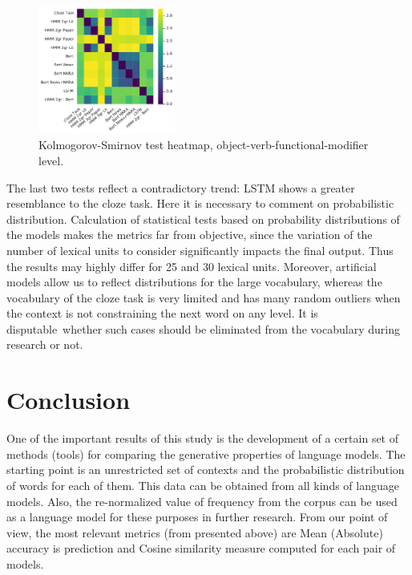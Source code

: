 \documentclass[a4paper]{article}
\begin{document}
\begin{figure}
\label{fig:heatmap-ks-ovfm}
\caption{Kolmogorov-Smirnov test heatmap, object-verb-functional-modifier level.}
\centering
\includegraphics[width=0.4\textwidth]{figures/pdf/ks-omvf.pdf}
\end{figure}

The last two tests reflect a contradictory trend: LSTM shows a greater resemblance to the cloze task. Here it is necessary to comment on probabilistic distribution. Calculation of statistical tests based on probability distributions of the models makes the metrics far from objective, since the variation of the number of lexical units to consider significantly impacts the final output. Thus the results may highly differ for 25 and 30 lexical units. Moreover, artificial models allow us to reflect distributions for the large vocabulary, whereas the vocabulary of the cloze task is very limited and has many random outliers when the context is not constraining the next word on any level. It is disputable whether such cases should be eliminated from the vocabulary during research or not.                          

\section{Conclusion}
One of the important results of this study is the development of a certain set of methods (tools) for comparing the generative properties of language models. The starting point is an unrestricted set of contexts and the probabilistic distribution of words for each of them. This data can be obtained from all kinds of language models. Also, the re-normalized value of frequency from the corpus can be used as a language model for these purposes in further research. From our point of view, the most relevant metrics (from presented above) are Mean (Absolute) accuracy is prediction
and Cosine similarity measure computed for each pair of models.  
\end{document}
